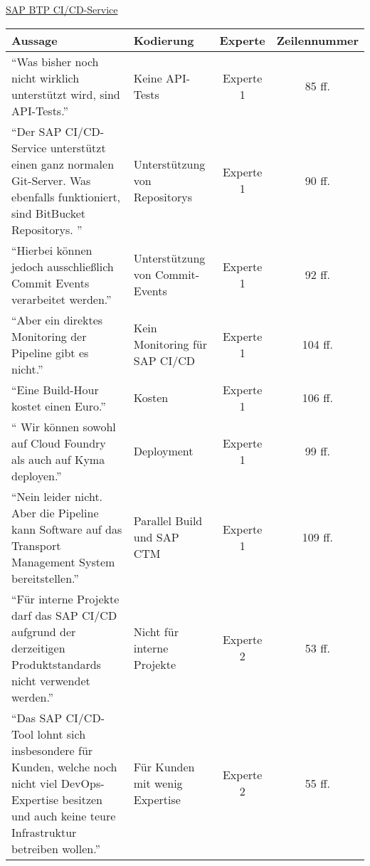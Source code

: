         \underline{SAP BTP CI/CD-Service}\\
\begin{longtable}{ |C{6cm}|C{3cm}|c|c| }
    \hline
    Aussage & Kodierung & Experte & Zeilennummer\\
    \hline
    \enquote{Was bisher noch nicht wirklich unterstützt wird, sind API-Tests.} & Keine API-Tests &Experte 1 & 85 ff. \\
    \hline
    \enquote{Der SAP CI/CD-Service unterstützt einen ganz normalen Git-Server. Was ebenfalls funktioniert, sind BitBucket Repositorys. } & Unterstützung von Repositorys &Experte 1 & 90 ff. \\
    \hline
    \enquote{Hierbei können jedoch ausschließlich Commit Events verarbeitet werden.} & Unterstützung von Commit-Events & Experte 1 & 92 ff. \\
    \hline
    \enquote{Aber ein direktes Monitoring der Pipeline gibt es nicht.} & Kein Monitoring für SAP CI/CD &Experte 1 & 104 ff. \\
    \hline
    \enquote{Eine Build-Hour kostet einen Euro.} & Kosten  &Experte 1 & 106 ff. \\
    \hline
    \enquote{ Wir können sowohl auf Cloud Foundry als auch auf Kyma deployen.} & Deployment  &Experte 1 & 99 ff. \\
    \hline
    \enquote{Nein leider nicht. Aber die Pipeline kann Software auf das Transport Management System bereitstellen.} & Parallel Build und SAP CTM  &Experte 1 & 109 ff. \\
    \hline
    \enquote{Für interne Projekte darf das SAP CI/CD aufgrund der derzeitigen Produktstandards nicht verwendet werden.} & Nicht für interne Projekte  & Experte 2 & 53 ff. \\
    \hline
    \enquote{Das SAP CI/CD-Tool lohnt sich insbesondere für Kunden, welche noch nicht viel DevOps-Expertise besitzen und auch keine teure Infrastruktur betreiben wollen.} & Für Kunden mit wenig Expertise  & Experte 2 & 55 ff. \\
    \hline
    \end{longtable}

